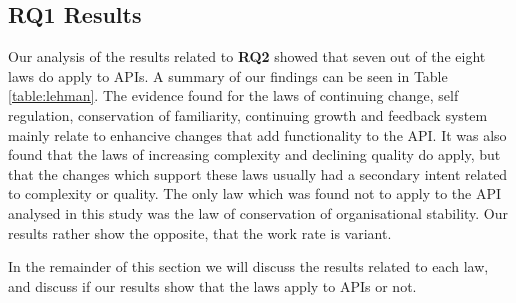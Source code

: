 \documentclass{sig-alternate}
\begin{document}
\subsection{RQ1 Results} \label{results_rq1}

Our analysis of the results related to \textbf{RQ2} showed that seven out of the eight laws \cite{lehman90sview} do apply to APIs. A summary of our findings can be seen in Table \ref{table:lehman}. The evidence found for the laws of continuing change, self regulation, conservation of familiarity, continuing growth and feedback system mainly relate to enhancive changes that add functionality to the API. It was also found that the laws of increasing complexity and declining quality do apply, but that the changes which support these laws usually had a secondary intent related to complexity or quality. The only law which was found not to apply to the API analysed in this study was the law of conservation of organisational stability. Our results rather show the opposite, that the work rate is variant. 

In the remainder of this section we will discuss the results related to each law, and discuss if our results show that the laws apply to APIs or not.




\end{document}
